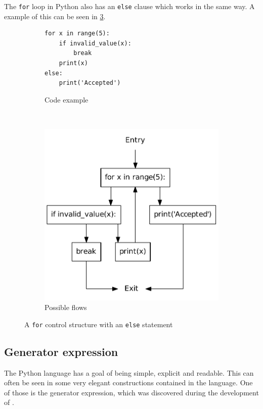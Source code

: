 The \texttt{for} loop in Python also has an \texttt{else} clause which works in the same way.
A example of this can be seen in \cref{python:for:else}.

\begin{figure}
  \centering
  \begin{subfigure}[b]{0.4\textwidth}
    \begin{lstlisting}[style=python]
for x in range(5):
    if invalid_value(x):
        break
    print(x)
else:
    print('Accepted')
    \end{lstlisting}
    \caption{Code example}\label{python:for:else:code}
  \end{subfigure}
  ~ %
  \begin{subfigure}[b]{0.4\textwidth}
    \centering
    \includegraphics[scale=.5]{./figures/for_else.pdf}
    \caption{Possible flows}
    \label{python:for:else:flow}
  \end{subfigure}
  \caption{A \texttt{for} control structure with an \texttt{else} statement}
  \label{python:for:else}
\end{figure}

\subsection{Generator expression}
The Python language has a goal of being simple, explicit and readable\citep{python_zen}.
This can often be seen in some very elegant constructions contained in the language.
One of those is the generator expression, which was discovered during the development of \pyt{}.

